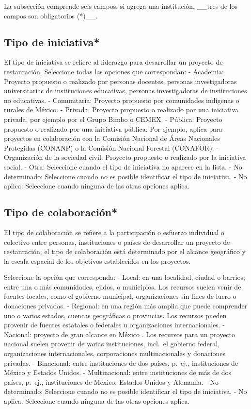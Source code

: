 \documentclass[
]{book}
\begin{document}
La subsección comprende seis campos; si agrega una institución, \_\_tres de los campos son obligatorios (*)\_\_.

\hypertarget{tipo-de-iniciativa}{%
\subsection{Tipo de iniciativa*}\label{tipo-de-iniciativa}}

El tipo de iniciativa se refiere al liderazgo para desarrollar un proyecto de restauración.
Seleccione todas las opciones que correspondan:
- Academia: Proyecto propuesto o realizado por personas docentes, personas investigadoras universitarias de instituciones educativas, personas investigadoras de instituciones no educativas.
- Comunitaria: Proyecto propuesto por comunidades indígenas o rurales de México.
- Privada: Proyecto propuesto o realizado por una iniciativa privada, por ejemplo por el Grupo Bimbo o CEMEX.
- Pública: Proyecto propuesto o realizado por una iniciativa pública. Por ejemplo, aplica para proyectos en colaboración con la Comisión Nacional de Áreas Nacionales Protegidas (CONANP) o la Comisión Nacional Forestal (CONAFOR).
- Organización de la sociedad civil: Proyecto propuesto o realizado por la iniciativa social.
- Otra: Seleccione cuando el tipo de iniciativa no aparece en la lista.
- No determinado: Seleccione cuando no es posible identificar el tipo de iniciativa.
- No aplica: Seleccione cuando ninguna de las otras opciones aplica.

\hypertarget{tipo-de-colaboraciuxf3n}{%
\subsection{Tipo de colaboración*}\label{tipo-de-colaboraciuxf3n}}

El tipo de colaboración se refiere a la participación o esfuerzo individual o colectivo entre personas, instituciones o países de desarrollar un proyecto de restauración; el tipo de colaboración está determinado por el alcance geográfico y la escala espacial de los objetivos establecidos en los proyectos.

Seleccione la opción que corresponda:
- Local: en una localidad, ciudad o barrios; entre una o más comunidades, ejidos, o municipios. Los recursos suelen venir de fuentes locales, como el gobierno municipal, organizaciones sin fines de lucro o donaciones privadas.
- Regional: en una región más amplia que puede comprender uno o varios estados, cuencas geográficas o provincias. Los recursos pueden provenir de fuentes estatales o federales u organizaciones internacionales.
- Nacional: proyecto de gran alcance en México . Los recursos para un proyecto nacional suelen provenir de varias instituciones, incl.~el gobierno federal, organizaciones internacionales, corporaciones multinacionales y donaciones privadas.
- Binacional: entre instituciones de dos países, p.~ej., instituciones de México y Estados Unidos.
- Multinacional: entre instituciones de más de dos países, p.~ej., instituciones de México, Estados Unidos y Alemania.
- No determinado: Seleccione cuando no es posible identificar el tipo de iniciativa.
- No aplica: Seleccione cuando ninguna de las otras opciones aplica.
\end{document}
